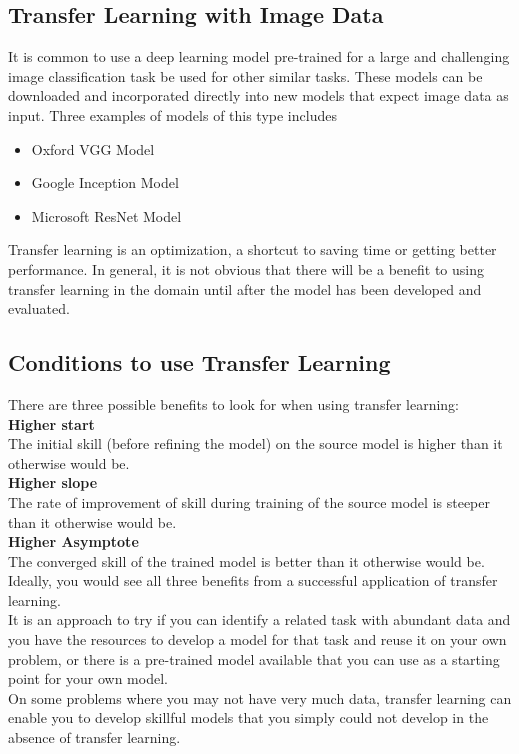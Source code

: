 \subsection{Transfer Learning with Image Data}
It is common to use a deep learning model pre-trained for a large and challenging image classification task be used for other similar tasks.
These models can be downloaded and incorporated directly into new models that expect image data as input.
Three examples of models of this type includes
\begin{itemize}
    \item Oxford VGG Model
    \item Google Inception Model
    \item Microsoft ResNet Model
\end{itemize}
Transfer learning is an optimization, a shortcut to saving time or getting better performance.
In general, it is not obvious that there will be a benefit to using transfer learning in the domain until after the model has been developed and evaluated.
\subsection{Conditions to use Transfer Learning}
There are three possible benefits to look for when using transfer learning:\\[0.3cm]
\textbf{Higher start}\\ The initial skill (before refining the model) on the source model is higher than it otherwise would be.\\
\textbf{Higher slope}\\ The rate of improvement of skill during training of the source model is steeper than it otherwise would be.\\
\textbf{Higher Asymptote}\\ The converged skill of the trained model is better than it otherwise would be.\\

Ideally, you would see all three benefits from a successful application of transfer learning.\\
It is an approach to try if you can identify a related task with abundant data and you have the resources to develop a model for that task and reuse it on your own problem, or there is a pre-trained model available that you can use as a starting point for your own model. \\
On some problems where you may not have very much data, transfer learning can enable you to develop skillful models that you simply could not develop in the absence of transfer learning.


